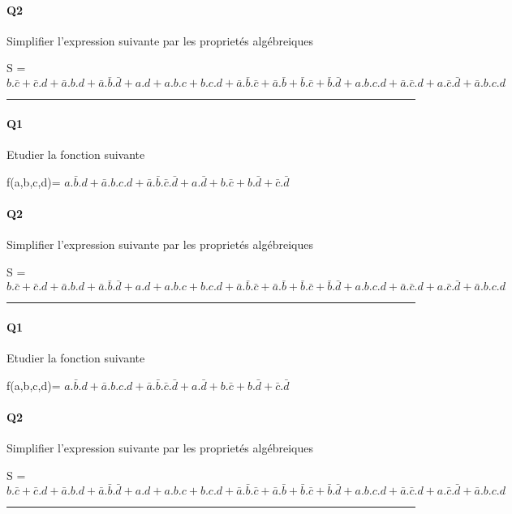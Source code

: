 \paragraph{Q2}

Simplifier l'expression suivante par les proprietés algébreiques 

S = $b.\bar c+\bar c.d+\bar a.b.d+\bar a.\bar b.\bar d + a.d+a.b.c+b.c.d+\bar a.\bar b.\bar c + \bar a.\bar b+\bar b.\bar c+\bar b.\bar d+a.b.c.d+\bar a.\bar c.d + a.\bar c.\bar d+\bar a.b.c.d$

\hrule width 1\linewidth
\paragraph{Q1}

Etudier la fonction suivante

f(a,b,c,d)= $a.\bar b.d+\bar a.b.c.d+\bar a.\bar b.\bar c.\bar d + a.\bar d+b.\bar c+b.\bar d+\bar c.\bar d$

\paragraph{Q2}

Simplifier l'expression suivante par les proprietés algébreiques 

S = $b.\bar c+\bar c.d+\bar a.b.d+\bar a.\bar b.\bar d + a.d+a.b.c+b.c.d+\bar a.\bar b.\bar c + \bar a.\bar b+\bar b.\bar c+\bar b.\bar d+a.b.c.d+\bar a.\bar c.d + a.\bar c.\bar d+\bar a.b.c.d$

\hrule width 1\linewidth
\paragraph{Q1}

Etudier la fonction suivante

f(a,b,c,d)= $a.\bar b.d+\bar a.b.c.d+\bar a.\bar b.\bar c.\bar d + a.\bar d+b.\bar c+b.\bar d+\bar c.\bar d$

\paragraph{Q2}

Simplifier l'expression suivante par les proprietés algébreiques 

S = $b.\bar c+\bar c.d+\bar a.b.d+\bar a.\bar b.\bar d + a.d+a.b.c+b.c.d+\bar a.\bar b.\bar c + \bar a.\bar b+\bar b.\bar c+\bar b.\bar d+a.b.c.d+\bar a.\bar c.d + a.\bar c.\bar d+\bar a.b.c.d$

\hrule width 1\linewidth\pagebreak
